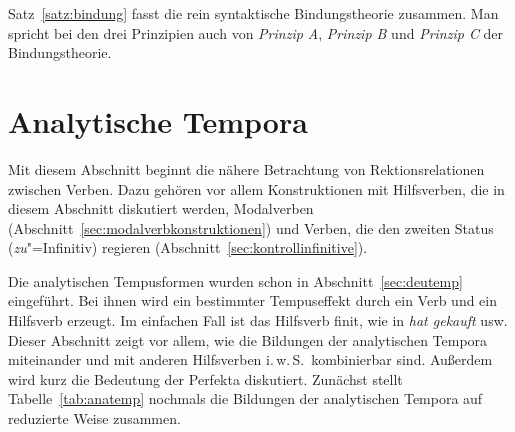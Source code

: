 Satz~\ref{satz:bindung} fasst die rein syntaktische Bindungstheorie zusammen.
Man spricht bei den drei Prinzipien auch von \textit{Prinzip A}, \textit{Prinzip B} und \textit{Prinzip C} der Bindungstheorie.





\section{Analytische Tempora}

\label{sec:analytischetempora}

Mit diesem Abschnitt beginnt die nähere Betrachtung von Rektionsrelationen zwischen Verben.
Dazu gehören vor allem Konstruktionen mit Hilfsverben, die in diesem Abschnitt diskutiert werden, Modalverben (Abschnitt~\ref{sec:modalverbkonstruktionen}) und Verben, die den zweiten Status (\textit{zu}"=Infinitiv) regieren (Abschnitt~\ref{sec:kontrollinfinitive}).

Die analytischen Tempusformen wurden schon in Abschnitt~\ref{sec:deutemp} eingeführt.
Bei ihnen wird ein bestimmter Tempuseffekt durch ein Verb und ein Hilfsverb erzeugt.
Im einfachen Fall ist das Hilfsverb finit, wie in \textit{hat gekauft} usw.
Dieser Abschnitt zeigt vor allem, wie die Bildungen der analytischen Tempora miteinander und mit anderen Hilfsverben i.\,w.\,S.\ kombinierbar sind.
Außerdem wird kurz die Bedeutung der Perfekta diskutiert.
Zunächst stellt Tabelle~\ref{tab:anatemp} nochmals die Bildungen der analytischen Tempora auf reduzierte Weise zusammen.

